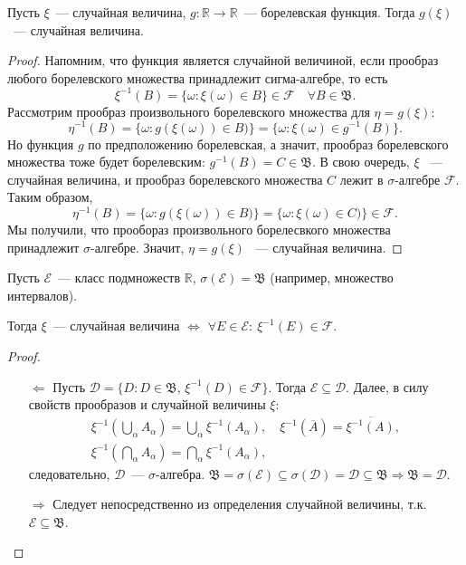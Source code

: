 \begin{thm*}
    Пусть $\xi$~--- случайная величина, $g: \mathbb{R} \rightarrow \mathbb{R}$~--- борелевская функция. Тогда $g(\xi)$~--- случайная величина.
\end{thm*}

\begin{proof}
    Напомним, что функция является случайной величиной, если прообраз любого борелевского множества принадлежит сигма-алгебре, то есть
    $$\xi^{-1}(B) = \{\omega \colon \xi(\omega) \in B \} \in \mathcal{F} \quad \forall B \in \mathfrak{B}.$$
    Рассмотрим прообраз произвольного борелевского множества для $\eta = g(\xi)$:
    $$\eta^{-1}(B) = \{\omega \colon g(\xi(\omega)) \in B) \} = \{\omega \colon \xi(\omega) \in g^{-1}(B)\}.
    $$
    Но функция $g$ по предположению борелевская, а значит, прообраз борелевского множества тоже будет борелевским: $g^{-1}(B) = C \in \mathfrak{B}$. В свою очередь, $\xi$ ~--- случайная величина, и прообраз борелевского множества $C$ лежит в $\sigma$-алгебре $\mathcal{F}$. Таким образом, $$ \eta^{-1}(B) = \{\omega \colon g(\xi(\omega)) \in B) \} = \{\omega \colon \xi(\omega) \in C) \} \in \mathcal{F}.
    $$
    Мы получили, что прообораз произвольного борелесвкого множества принадлежит $\sigma$-алгебре. Значит, $\eta = g(\xi)$ ~--- случайная величина.
\end{proof}

\begin{thm*}
    Пусть $\mathcal{E}$~--- класс подмножеств $\mathbb{R}$, $\sigma(\mathcal{E}) = \mathfrak{B}$ (например, множество интервалов).

    Тогда $\xi$~--- случайная величина $\Leftrightarrow$ $\forall E \in \mathcal{E}: ~\xi^{-1}(E) \in \mathcal{F}$.
\end{thm*}

\begin{proof}
    \begin{itemize}
        \item[$\Leftarrow$] Пусть $\mathcal{D} = \{D \colon D \in \mathfrak{B}, \, \xi^{-1}(D) \in \mathcal{F} \}$. Тогда $\mathcal{E} \subseteq \mathcal{D}$. Далее, в силу свойств прообразов и случайной величины $\xi$:
    \begin{gather*}
        \xi^{-1}\left(\bigcup\limits_\alpha A_\alpha\right) 
        = \bigcup\limits_\alpha \xi^{-1}(A_\alpha), \quad
        \xi^{-1}(\overline{A}) 
        = \overline{\xi^{-1}(A)}, \\
        \xi^{-1}\left(\bigcap\limits_\alpha A_\alpha\right) = \bigcap\limits_\alpha \xi^{-1}(A_\alpha),
    \end{gather*}
    следовательно, $\mathcal{D}$~--- ${\sigma \text{-алгебра}}$. $\mathfrak{B} = \sigma(\mathcal{E}) \subseteq \sigma(\mathcal{D}) = \mathcal{D} \subseteq \mathfrak{B} \Rightarrow \mathfrak{B} = \mathcal{D}.$
    
    \item[$\Rightarrow$] Следует непосредственно из определения случайной величины, т.к. ${\mathcal{E} \subseteq \mathfrak{B}}$.
    \end{itemize}
\end{proof}


